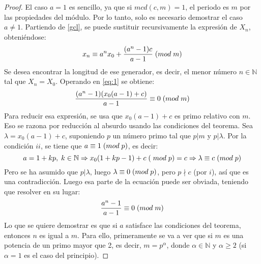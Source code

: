 \begin{proof}
El caso $a=1$ es sencillo, ya que si $mcd(c,m)=1$, el periodo es $m$ por las propiedades del módulo. Por lo tanto, solo es necesario demostrar el caso $a\neq 1$. Partiendo de \eqref{gcl}, se puede sustituir recursivamente la expresión de $X_n$, obteniéndose:
\begin{equation}\label{eq:1}
x_n \equiv a^nx_0+\frac{(a^n-1)c}{a-1} \;(mod \; m)
\end{equation}
Se desea encontrar la longitud de ese generador, es decir, el menor número $n\in\mathbb{N}$ tal que $X_n=X_0$. Operando en \eqref{eq:1} se obtiene:
\[
\frac{(a^n-1)(x_0(a-1)+c)}{a-1} \equiv 0 \;(mod \; m)
\]
Para reducir esa expresión, se usa que $x_0(a-1)+c$ es primo relativo con $m$. Eso se razona por reducción al absurdo usando las condiciones del teorema. Sea $\lambda=x_0(a-1)+c$, suponiendo $p$ un número primo tal que $p|m$ y $p|\lambda$. Por la condición $ii$, se tiene que $a \equiv 1 \;(mod \; p)$, es decir:
\[
a = 1+kp, \;k\in\mathbb{N} \Rightarrow x_0(1+kp-1)+c\;(\;mod\;p) = c \Rightarrow \lambda \equiv c \;(mod \; p)
\]
Pero se ha asumido que $p|\lambda$, luego $\lambda \equiv 0 \;(mod \; p)$, pero $p\nmid c$ (por $i$), así que es una contradicción. Luego esa parte de la ecuación puede ser obviada, teniendo que resolver en su lugar:
\begin{equation}\label{eq:gcl2}
\frac{a^n-1}{a-1} \equiv 0 \;(mod \; m)
\end{equation}
Lo que se quiere demostrar es que si $a$ satisface las condiciones del teorema, entonces $n$ es igual a $m$. Para ello, primeramente se va a ver que si $m$ es una potencia de un primo mayor que 2, es decir, $m=p^\alpha$, donde $\alpha\in\mathbb{N}$ y $\alpha\geq 2$ (si $\alpha=1$ es el caso del principio).


\end{proof}
